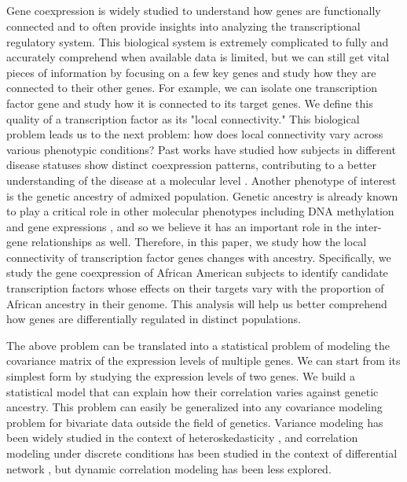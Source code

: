 \documentclass[aoas,preprint]{imsart}
\numberwithin{equation}{section}
\theoremstyle{plain}
\begin{document}
\subsection*{}
Gene coexpression is widely studied to understand how genes are functionally connected and to often provide insights into analyzing the transcriptional regulatory system. This biological system is extremely complicated to fully and accurately comprehend when available data is limited, but we can still get vital pieces of information by focusing on a few key genes and study how they are connected to their other genes. For example, we can isolate one transcription factor gene and study how it is connected to its target genes. We define this quality of a transcription factor as its "local connectivity." This biological problem leads us to the next problem: how does local connectivity vary across various phenotypic conditions? Past works have studied how subjects in different disease statuses show distinct coexpression patterns, contributing to a better understanding of the disease at a molecular level \cite{de2010differential}. Another phenotype of interest is the genetic ancestry of admixed population. Genetic ancestry is already known to play a critical role in other molecular phenotypes including DNA methylation and gene expressions \cite{price2008effects, galanter2017differential}, and so we believe it has an important role in the inter-gene relationships as well. Therefore, in this paper, we study how the local connectivity of transcription factor genes changes with ancestry. Specifically, we study the gene coexpression of African American subjects to identify candidate transcription factors whose effects on their targets vary with the proportion of African ancestry in their genome. This analysis will help us better comprehend how genes are differentially regulated in distinct populations. \bigskip

The above problem can be translated into a statistical problem of modeling the covariance matrix of the expression levels of multiple genes. We can start from its simplest form by studying the expression levels of two genes. We build a statistical model that can explain how their correlation varies against genetic ancestry. This problem can easily be generalized into any covariance modeling problem for bivariate data outside the field of genetics. Variance modeling has been widely studied in the context of heteroskedasticity \cite{breusch1979simple, glejser1969new, white1980heteroskedasticity}, and correlation modeling under discrete conditions has been studied in the context of differential network \cite{ideker2012differential}, but dynamic correlation modeling has been less explored. \bigskip
\end{document}
